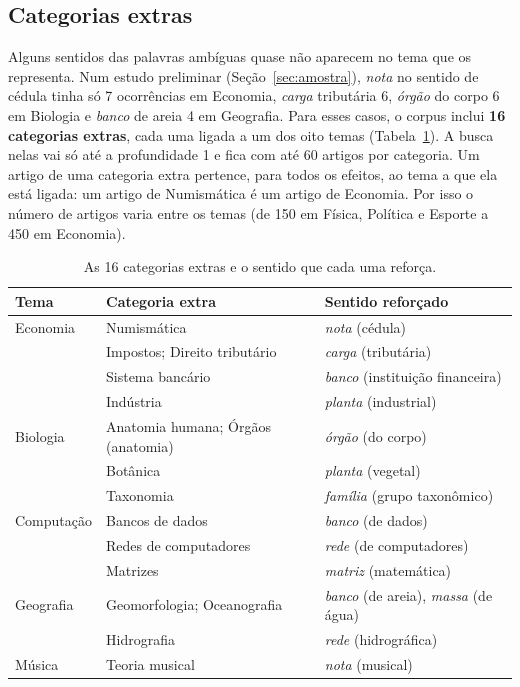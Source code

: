 \subsection{Categorias extras}\label{sec:extras}

Alguns sentidos das palavras ambíguas quase não aparecem no tema que os representa. Num estudo
preliminar (Seção~\ref{sec:amostra}), \emph{nota} no sentido de cédula tinha só 7 ocorrências
em Economia, \emph{carga} tributária 6, \emph{órgão} do corpo 6 em Biologia e \emph{banco} de
areia 4 em Geografia. Para esses casos, o corpus inclui \textbf{16 categorias extras}, cada uma
ligada a um dos oito temas (Tabela~\ref{tab:extras}). A busca nelas vai só até a profundidade
1 e fica com até 60 artigos por categoria. Um artigo de uma categoria extra pertence, para
todos os efeitos, ao tema a que ela está ligada: um artigo de Numismática é um artigo de
Economia. Por isso o número de artigos varia entre os temas (de 150 em Física, Política e
Esporte a 450 em Economia).

\begin{table}[htbp]
\centering
\caption{As 16 categorias extras e o sentido que cada uma reforça.}\label{tab:extras}
\small
\begin{tabularx}{\linewidth}{@{}l >{\raggedright\arraybackslash}p{6.2cm} X@{}}
\toprule
\textbf{Tema} & \textbf{Categoria extra} & \textbf{Sentido reforçado} \\
\midrule
Economia & Numismática & \emph{nota} (cédula) \\
 & Impostos; Direito tributário & \emph{carga} (tributária) \\
 & Sistema bancário & \emph{banco} (instituição financeira) \\
 & Indústria & \emph{planta} (industrial) \\
\midrule
Biologia & Anatomia humana; Órgãos (anatomia) & \emph{órgão} (do corpo) \\
 & Botânica & \emph{planta} (vegetal) \\
 & Taxonomia & \emph{família} (grupo taxonômico) \\
\midrule
Computação & Bancos de dados & \emph{banco} (de dados) \\
 & Redes de computadores & \emph{rede} (de computadores) \\
 & Matrizes & \emph{matriz} (matemática) \\
\midrule
Geografia & Geomorfologia; Oceanografia & \emph{banco} (de areia), \emph{massa} (de água) \\
 & Hidrografia & \emph{rede} (hidrográfica) \\
\midrule
Música & Teoria musical & \emph{nota} (musical) \\
\bottomrule
\end{tabularx}
\end{table}

